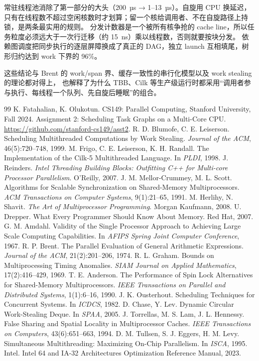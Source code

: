 \documentclass[11pt,a4paper]{ctexart}
\begin{document}
常驻线程池消除了第一部分的大头（200~µs → 1--13~µs）。自旋用 CPU 换延迟，只有在线程数不超过空闲核数时才划算；留一个核给调用者、不在自旋路径上持锁，是两条最实用的规则。
分发计数器是一个被所有核争抢的 cache line，所以任务粒度必须远大于一次行迁移（约 15~ns）乘以线程数，否则就要按块分发。
依赖图调度把同步执行的逐层屏障换成了真正的 DAG，独立 launch 互相填尾，树形归约达到 work 下界的 96\%。

这些结论与 Brent 的 work/span 界、缓存一致性的串行化模型以及 work stealing 的理论都对得上，
也解释了为什么 TBB、Cilk 等生产级运行时都采用``调用者参与执行、每线程一个队列、先自旋后睡眠''的组合。

\begin{thebibliography}{99}
 K. Fatahalian, K. Olukotun. CS149: Parallel Computing, Stanford University, Fall 2024. Assignment 2: Scheduling Task Graphs on a Multi-Core CPU. \url{https://github.com/stanford-cs149/asst2}.
 R. D. Blumofe, C. E. Leiserson. Scheduling Multithreaded Computations by Work Stealing. \emph{Journal of the ACM}, 46(5):720--748, 1999.
 M. Frigo, C. E. Leiserson, K. H. Randall. The Implementation of the Cilk-5 Multithreaded Language. In \emph{PLDI}, 1998.
 J. Reinders. \emph{Intel Threading Building Blocks: Outfitting C++ for Multi-core Processor Parallelism}. O'Reilly, 2007.
 J. M. Mellor-Crummey, M. L. Scott. Algorithms for Scalable Synchronization on Shared-Memory Multiprocessors. \emph{ACM Transactions on Computer Systems}, 9(1):21--65, 1991.
 M. Herlihy, N. Shavit. \emph{The Art of Multiprocessor Programming}. Morgan Kaufmann, 2008.
 U. Drepper. What Every Programmer Should Know About Memory. Red Hat, 2007.
 G. M. Amdahl. Validity of the Single Processor Approach to Achieving Large Scale Computing Capabilities. In \emph{AFIPS Spring Joint Computer Conference}, 1967.
 R. P. Brent. The Parallel Evaluation of General Arithmetic Expressions. \emph{Journal of the ACM}, 21(2):201--206, 1974.
 R. L. Graham. Bounds on Multiprocessing Timing Anomalies. \emph{SIAM Journal on Applied Mathematics}, 17(2):416--429, 1969.
 T. E. Anderson. The Performance of Spin Lock Alternatives for Shared-Memory Multiprocessors. \emph{IEEE Transactions on Parallel and Distributed Systems}, 1(1):6--16, 1990.
 J. K. Ousterhout. Scheduling Techniques for Concurrent Systems. In \emph{ICDCS}, 1982.
 D. Chase, Y. Lev. Dynamic Circular Work-Stealing Deque. In \emph{SPAA}, 2005.
 J. Torrellas, M. S. Lam, J. L. Hennessy. False Sharing and Spatial Locality in Multiprocessor Caches. \emph{IEEE Transactions on Computers}, 43(6):651--663, 1994.
 D. M. Tullsen, S. J. Eggers, H. M. Levy. Simultaneous Multithreading: Maximizing On-Chip Parallelism. In \emph{ISCA}, 1995.
 Intel. Intel 64 and IA-32 Architectures Optimization Reference Manual, 2023.
\end{thebibliography}
\end{document}
